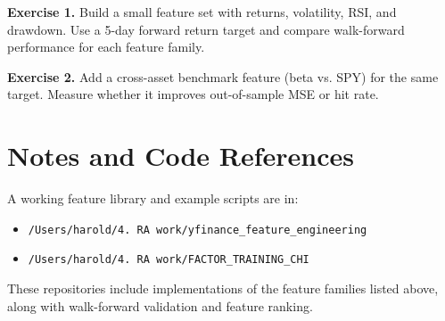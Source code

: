 \documentclass[11pt]{article}
\begin{document}
\textbf{Exercise 1.} Build a small feature set with returns, volatility,
RSI, and drawdown. Use a 5-day forward return target and compare
walk-forward performance for each feature family.

\textbf{Exercise 2.} Add a cross-asset benchmark feature (beta vs. SPY)
for the same target. Measure whether it improves out-of-sample MSE or
hit rate.

\section*{Notes and Code References}

A working feature library and example scripts are in:

\begin{itemize}[leftmargin=*]
  \item \texttt{/Users/harold/4. RA work/yfinance\_feature\_engineering}
  \item \texttt{/Users/harold/4. RA work/FACTOR\_TRAINING\_CHI}
\end{itemize}

These repositories include implementations of the feature families
listed above, along with walk-forward validation and feature ranking.
\end{document}
